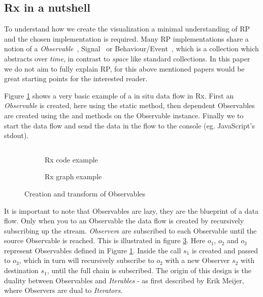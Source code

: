 \subsection{Rx in a nutshell}
\label{nutshell}

To understand how we create the visualization a minimal understanding of RP and the chosen implementation is required. Many RP implementations share a notion of a \textit{Observable}~\cite{meijer2010subject}, Signal~\cite{czaplicki2012elm} or Behaviour/Event~\cite{elliott1997functional},  which is a collection which abstracts over \textit{time}, in contrast to \textit{space} like standard collections. In this paper we do not aim to fully explain RP, for this above mentioned papers would be great starting points for the interested reader.

Figure \ref{sample1} shows a very basic example of a in situ data flow in Rx. First an \textit{Observable} is created, here using the static  method, then dependent Observables are created using the  and  methods on the Observable instance. Finally we  to start the data flow and send the data in the flow to the console (eg. JavaScript's stdout).

\begin{figure}

\begin{subfigure}[a]{\columnwidth}
\inputminted[tabsize=2]{javascript}{listings/sample1.js}	
\caption{Rx code example}
\label{sample1}
\end{subfigure}

\begin{subfigure}[b]{\columnwidth}
\centering

\caption{Rx graph example}
\label{chaincreate}
\end{subfigure}

\caption{Creation and transform of Observables}

\end{figure}

It is important to note that Observables are lazy, they are the blueprint of a data flow. Only when you  to an Observable the data flow is created by recursively subscribing up the stream. \textit{Observer}s are subscribed to each Observable until the source Observable is reached.
This is illustrated in figure \ref{chaincreate}. Here $o_1$, $o_2$ and $o_3$ represent Observables defined in Figure \ref{sample1}. Inside the  call $s_1$ is created and passed to $o_3$, which in turn will recursively subscribe to $o_2$ with a new Observer $s_2$ with destination $s_1$, until the full chain is subscribed.
The origin of this design is the duality between Observables and \textit{Iterables} - as first described by Erik Meijer, where Observers are dual to \textit{Iterators}.

